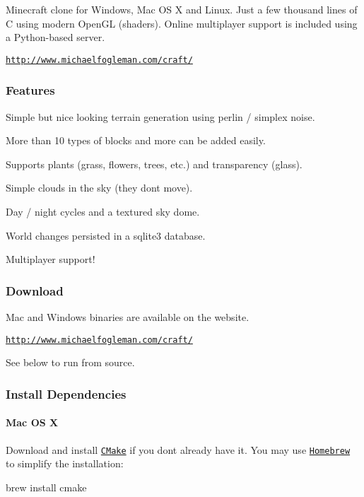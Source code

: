 Minecraft clone for Windows, Mac OS X and Linux. Just a few thousand lines of C using modern Open\+GL (shaders). Online multiplayer support is included using a Python-\/based server.

\href{http://www.michaelfogleman.com/craft/}{\tt http\+://www.\+michaelfogleman.\+com/craft/}



\subsubsection*{Features}


\begin{DoxyItemize}
\item Simple but nice looking terrain generation using perlin / simplex noise.
\item More than 10 types of blocks and more can be added easily.
\item Supports plants (grass, flowers, trees, etc.) and transparency (glass).
\item Simple clouds in the sky (they don\textquotesingle{}t move).
\item Day / night cycles and a textured sky dome.
\item World changes persisted in a sqlite3 database.
\item Multiplayer support!
\end{DoxyItemize}

\subsubsection*{Download}

Mac and Windows binaries are available on the website.

\href{http://www.michaelfogleman.com/craft/}{\tt http\+://www.\+michaelfogleman.\+com/craft/}

See below to run from source.

\subsubsection*{Install Dependencies}

\paragraph*{Mac OS X}

Download and install \href{http://www.cmake.org/cmake/resources/software.html}{\tt C\+Make} if you don\textquotesingle{}t already have it. You may use \href{http://brew.sh}{\tt Homebrew} to simplify the installation\+: \begin{DoxyVerb}brew install cmake
\end{DoxyVerb}


